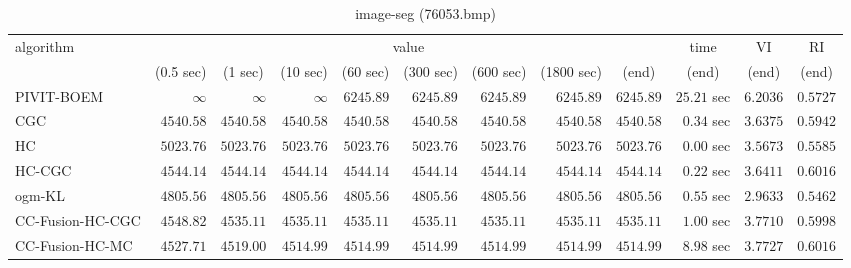 \begin{table}[H]
\scriptsize
\centering
\caption{image-seg (76053.bmp)}
\label{tab:anytimetable-image-seg-76053.bmp}
\begin{tabular}{lrrrrrrrrrrr}
\toprule
           algorithm &                                   \multicolumn{8}{c}{value} & \multicolumn{1}{c}{time}    & \multicolumn{1}{c}{VI}  & \multicolumn{1}{c}{RI} \\  
\cmidrule(lr){2-9}\cmidrule(lr){10-10} \cmidrule(lr){11-11} \cmidrule(lr){12-12}   
                     & \multicolumn{1}{c}{(0.5 sec)} & \multicolumn{1}{c}{(1 sec)} & \multicolumn{1}{c}{(10 sec)} & \multicolumn{1}{c}{(60 sec)} & \multicolumn{1}{c}{(300 sec)} & \multicolumn{1}{c}{(600 sec)} & \multicolumn{1}{c}{(1800 sec)} & \multicolumn{1}{c}{(end)} & \multicolumn{1}{c}{(end)}    & \multicolumn{1}{c}{(end)}   & \multicolumn{1}{c}{(end)}  \\ \midrule 
          PIVIT-BOEM & $\infty$ & $\infty$ & $\infty$ & $      6245.89$ & $      6245.89$ & $      6245.89$ & $      6245.89$ & $      6245.89$ & $        25.21$ sec    & $       6.2036$  & $       0.5727$ \\ 
                 CGC & $      4540.58$ & $      4540.58$ & $      4540.58$ & $      4540.58$ & $      4540.58$ & $      4540.58$ & $      4540.58$ & $      4540.58$ & $         0.34$ sec    & $       3.6375$  & $       0.5942$ \\ 
                  HC & $      5023.76$ & $      5023.76$ & $      5023.76$ & $      5023.76$ & $      5023.76$ & $      5023.76$ & $      5023.76$ & $      5023.76$ & $         0.00$ sec    & $       3.5673$  & $       0.5585$ \\ 
              HC-CGC & $      4544.14$ & $      4544.14$ & $      4544.14$ & $      4544.14$ & $      4544.14$ & $      4544.14$ & $      4544.14$ & $      4544.14$ & $         0.22$ sec    & $       3.6411$  & $       0.6016$ \\ 
              ogm-KL & $      4805.56$ & $      4805.56$ & $      4805.56$ & $      4805.56$ & $      4805.56$ & $      4805.56$ & $      4805.56$ & $      4805.56$ & $         0.55$ sec    & $       2.9633$  & $       0.5462$ \\ 
    CC-Fusion-HC-CGC & $      4548.82$ & $      4535.11$ & $      4535.11$ & $      4535.11$ & $      4535.11$ & $      4535.11$ & $      4535.11$ & $      4535.11$ & $         1.00$ sec    & $       3.7710$  & $       0.5998$ \\ 
     CC-Fusion-HC-MC & $      4527.71$ & $      4519.00$ & $      4514.99$ & $      4514.99$ & $      4514.99$ & $      4514.99$ & $      4514.99$ & $      4514.99$ & $         8.98$ sec    & $       3.7727$  & $       0.6016$ \\ 

\end{tabular}
\end{table}
